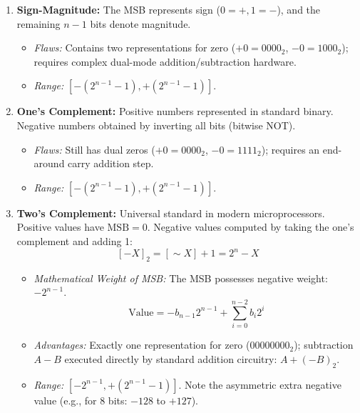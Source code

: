 \begin{enumerate}[label=\bfseries\arabic*.]
    \item \textbf{Sign-Magnitude:} The MSB represents sign ($0 = +, 1 = -$), and the remaining $n-1$ bits denote magnitude.
    \begin{itemize}
        \item \textit{Flaws:} Contains two representations for zero ($+0 = 0000_2$, $-0 = 1000_2$); requires complex dual-mode addition/subtraction hardware.
        \item \textit{Range:} $[-(2^{n-1}-1), +(2^{n-1}-1)]$.
    \end{itemize}
    \item \textbf{One's Complement:} Positive numbers represented in standard binary. Negative numbers obtained by inverting all bits (bitwise NOT).
    \begin{itemize}
        \item \textit{Flaws:} Still has dual zeros ($+0 = 0000_2$, $-0 = 1111_2$); requires an end-around carry addition step.
        \item \textit{Range:} $[-(2^{n-1}-1), +(2^{n-1}-1)]$.
    \end{itemize}
    \item \textbf{Two's Complement:} Universal standard in modern microprocessors. Positive values have $\text{MSB}=0$. Negative values computed by taking the one's complement and adding 1:
    \begin{equation}
    \label{eq:twos_complement_def}
    [-X]_2 = [\sim X] + 1 = 2^n - X
    \end{equation}
    \begin{itemize}
        \item \textit{Mathematical Weight of MSB:} The MSB possesses negative weight: $-2^{n-1}$.
        \[ \text{Value} = -b_{n-1} 2^{n-1} + \sum_{i=0}^{n-2} b_i 2^i \]
        \item \textit{Advantages:} Exactly one representation for zero ($00000000_2$); subtraction $A - B$ executed directly by standard addition circuitry: $A + (-B)_2$.
        \item \textit{Range:} $[-2^{n-1}, +(2^{n-1}-1)]$. Note the asymmetric extra negative value (e.g., for 8 bits: $-128$ to $+127$).
    \end{itemize}
\end{enumerate}

